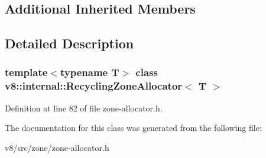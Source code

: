 \subsection*{Additional Inherited Members}


\subsection{Detailed Description}
\subsubsection*{template$<$typename T$>$\newline
class v8\+::internal\+::\+Recycling\+Zone\+Allocator$<$ T $>$}



Definition at line 82 of file zone-\/allocator.\+h.



The documentation for this class was generated from the following file\+:\begin{DoxyCompactItemize}
\item 
v8/src/zone/zone-\/allocator.\+h\end{DoxyCompactItemize}
